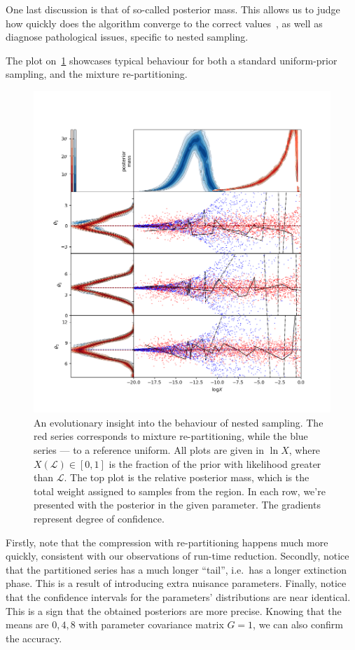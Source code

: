 \documentclass[usenatbib]{mnras}
\begin{document}
One last discussion is that of so-called posterior mass. This allows
us to judge how quickly does the algorithm converge to the correct
values~\cite{higson2018nestcheck}, as well as diagnose pathological
issues, specific to nested sampling.

The plot on~\cref{fig:higson} showcases typical behaviour for both
a standard uniform-prior sampling, and the mixture re-partitioning.

\begin{figure}
\includegraphics[width=.5\textwidth]{./illustrations/higson.png}
\caption{An evolutionary insight into the behaviour of nested sampling. The \color{red} red \color{black} series corresponds to mixture re-partitioning, while the \color{blue} blue \color{black} series --- to a reference uniform. All plots are given in \(\ln X\), where \(X(\mathcal{L}) \in [0,1]\) is the fraction of the prior with likelihood greater than \(\mathcal{L}\). The top plot is the relative posterior mass, which is the total weight assigned to samples from the region. In each row, we're presented with the posterior in the given parameter. The gradients represent degree of confidence.\label{fig:higson}}
\end{figure}

Firstly, note that the compression with re-partitioning happens much
more quickly, consistent with our observations of run-time
reduction. Secondly, notice that the partitioned series has a much
longer ``tail'', i.e.~has a longer extinction phase. This is a
result of introducing extra nuisance parameters. Finally, notice
that the confidence intervals for the parameters' distributions are
near identical. This is a sign that the obtained posteriors are more
precise. Knowing that the means are \({0, 4, 8}\) with parameter
covariance matrix \(G = 1\), we can also confirm the accuracy.
\end{document}

